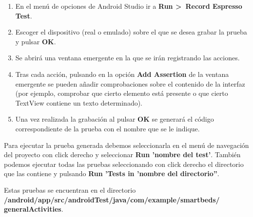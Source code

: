 \begin{enumerate}
	\item En el menú de opciones de Android Studio ir a \textbf{Run >~Record Espresso Test}. 
	\item Escoger el dispositivo (real o emulado) sobre el que se desea grabar la prueba y pulsar \textbf{OK}. 
	\item Se abrirá una ventana emergente en la que se irán registrando las acciones. 
	\item Tras cada acción, pulsando en la opción \textbf{Add Assertion} de la ventana emergente se pueden añadir comprobaciones sobre el contenido de la interfaz (por ejemplo, comprobar que cierto elemento está presente o que cierto TextView contiene un texto determinado). 
	\item Una vez realizada la grabación al pulsar \textbf{OK} se generará el código correspondiente de la prueba con el nombre que se le indique. 
\end{enumerate} 

Para ejecutar la prueba generada debemos seleccionarla en el menú de navegación del proyecto con click derecho y seleccionar \textbf{Run 'nombre del test'}. También podemos ejecutar todas las pruebas seleccionando con click derecho el directorio que las contiene y pulsando \textbf{Run 'Tests in 'nombre del directorio''}. 

Estas pruebas se encuentran en el directorio \\ \textbf{/android/app/src/androidTest/java/com/example/smartbeds/\\generalActivities}.

